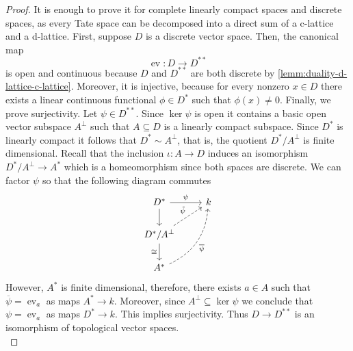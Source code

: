\begin{proof}
	It is enough to prove it for complete linearly compact spaces and discrete spaces, as every Tate space can be decomposed into a direct sum of a c-lattice and a d-lattice. First, suppose $D$ is a discrete vector space. Then, the canonical map
	\[
		\operatorname{ev}\colon D \to D^{**}
	\]
	is open and continuous because $D$ and $D^{**}$ are both discrete by \linebreak \cref{lemm:duality-d-lattice-c-lattice}. Moreover, it is injective, because for every nonzero $x \in D$ there exists a linear continuous functional $\phi\in D^{*}$ such that $\phi(x)\neq 0$. Finally, we prove surjectivity. Let $\psi \in D^{**}$. Since $\ker \psi$ is open it contains a basic open vector subspace $A^{\perp}$ such that $A \subseteq D$ is a linearly compact subspace. Since $D^{*}$ is linearly compact it follows that $D^{*} \sim A^{\perp}$, that is, the quotient $D^{*}/A^{\perp}$ is finite dimensional. Recall that the inclusion $\iota\colon A \to D$ induces an isomorphism $D^{*}/A^{\perp} \to A^{*}$ which is a homeomorphism since both spaces are discrete. We can factor $\psi$ so that the following diagram commutes
	\[
	\begin{tikzcd}
		D^{*} \arrow[r, "\psi"] \arrow[d] & k \\
		D^{*}/A^{\perp} \arrow[ru, dashed, "\tilde{\psi}"] \arrow[d, swap, "\cong"] & \\
		A^{*} \arrow[ruu, dashed, swap, bend right, "\overline{\psi}"]
	\end{tikzcd}
	\]
	However, $A^{*}$ is finite dimensional, therefore, there exists $a \in A$ such that $\overline{\psi} = \operatorname{ev}_{a}$ as maps $A^{*}\to k$. Moreover, since $A^{\perp} \subseteq \ker\psi$ we conclude that $\psi = \operatorname{ev}_{a}$ as maps $D^{*} \to k$. This implies surjectivity. Thus $D \to D^{**}$ is an isomorphism of topological vector spaces. \\


\end{proof}
